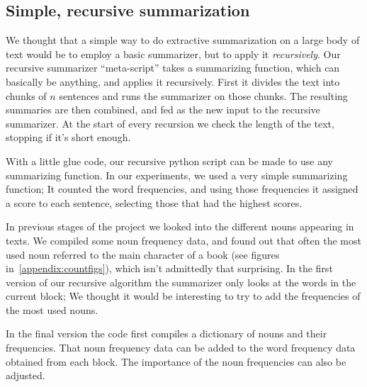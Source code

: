 \subsection{Simple, recursive summarization}

We thought that a simple way to do extractive summarization on a large body of
text would be to employ a basic summarizer, but to apply it
\textit{recursively}. Our recursive summarizer ``meta-script'' takes a
summarizing function, which can basically be anything, and applies it
recursively. First it divides the text into chunks of \(n\) sentences and runs
the summarizer on those chunks. The resulting summaries are then combined, and
fed as the new input to the recursive summarizer. At the start of every
recursion we check the length of the text, stopping if it's short enough.

With a little glue code, our recursive python script can be made to use any
summarizing function. In our experiments, we used a very simple summarizing
function; It counted the word frequencies, and using those frequencies it
assigned a score to each sentence, selecting those that had the highest scores.

In previous stages of the project we looked into the different nouns appearing
in texts. We compiled some noun frequency data, and found out that
often the most used noun referred to the main character of a book (see
figures in~\ref{appendix:countfigs}), which isn't
admittedly that surprising. In the first version of our recursive algorithm the
summarizer only looks at the words in the current block; We thought it would be
interesting to try to add the frequencies of the most used nouns. 

In the final version the code first compiles a dictionary of nouns and their
frequencies. That noun frequency data can be added to the word frequency data
obtained from each block. The importance of the noun frequencies can also be
adjusted.
